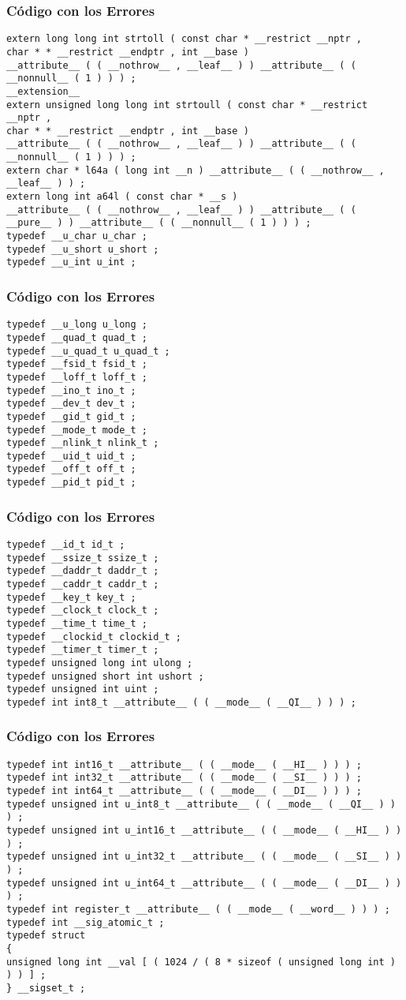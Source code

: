 \documentclass{beamer}
\begin{document}
\begin{frame}[fragile]
\frametitle{C\'odigo con los Errores}
\begin{lstlisting}[style=CStyle]
extern long long int strtoll ( const char * __restrict __nptr , 
char * * __restrict __endptr , int __base ) 
__attribute__ ( ( __nothrow__ , __leaf__ ) ) __attribute__ ( ( __nonnull__ ( 1 ) ) ) ; 
__extension__ 
extern unsigned long long int strtoull ( const char * __restrict __nptr , 
char * * __restrict __endptr , int __base ) 
__attribute__ ( ( __nothrow__ , __leaf__ ) ) __attribute__ ( ( __nonnull__ ( 1 ) ) ) ; 
extern char * l64a ( long int __n ) __attribute__ ( ( __nothrow__ , __leaf__ ) ) ; 
extern long int a64l ( const char * __s ) 
__attribute__ ( ( __nothrow__ , __leaf__ ) ) __attribute__ ( ( __pure__ ) ) __attribute__ ( ( __nonnull__ ( 1 ) ) ) ; 
typedef __u_char u_char ; 
typedef __u_short u_short ; 
typedef __u_int u_int ; 
\end{lstlisting}
\end{frame}
\begin{frame}[fragile]
\frametitle{C\'odigo con los Errores}
\begin{lstlisting}[style=CStyle]
typedef __u_long u_long ; 
typedef __quad_t quad_t ; 
typedef __u_quad_t u_quad_t ; 
typedef __fsid_t fsid_t ; 
typedef __loff_t loff_t ; 
typedef __ino_t ino_t ; 
typedef __dev_t dev_t ; 
typedef __gid_t gid_t ; 
typedef __mode_t mode_t ; 
typedef __nlink_t nlink_t ; 
typedef __uid_t uid_t ; 
typedef __off_t off_t ; 
typedef __pid_t pid_t ; 
\end{lstlisting}
\end{frame}
\begin{frame}[fragile]
\frametitle{C\'odigo con los Errores}
\begin{lstlisting}[style=CStyle]
typedef __id_t id_t ; 
typedef __ssize_t ssize_t ; 
typedef __daddr_t daddr_t ; 
typedef __caddr_t caddr_t ; 
typedef __key_t key_t ; 
typedef __clock_t clock_t ; 
typedef __time_t time_t ; 
typedef __clockid_t clockid_t ; 
typedef __timer_t timer_t ; 
typedef unsigned long int ulong ; 
typedef unsigned short int ushort ; 
typedef unsigned int uint ; 
typedef int int8_t __attribute__ ( ( __mode__ ( __QI__ ) ) ) ; 
\end{lstlisting}
\end{frame}
\begin{frame}[fragile]
\frametitle{C\'odigo con los Errores}
\begin{lstlisting}[style=CStyle]
typedef int int16_t __attribute__ ( ( __mode__ ( __HI__ ) ) ) ; 
typedef int int32_t __attribute__ ( ( __mode__ ( __SI__ ) ) ) ; 
typedef int int64_t __attribute__ ( ( __mode__ ( __DI__ ) ) ) ; 
typedef unsigned int u_int8_t __attribute__ ( ( __mode__ ( __QI__ ) ) ) ; 
typedef unsigned int u_int16_t __attribute__ ( ( __mode__ ( __HI__ ) ) ) ; 
typedef unsigned int u_int32_t __attribute__ ( ( __mode__ ( __SI__ ) ) ) ; 
typedef unsigned int u_int64_t __attribute__ ( ( __mode__ ( __DI__ ) ) ) ; 
typedef int register_t __attribute__ ( ( __mode__ ( __word__ ) ) ) ; 
typedef int __sig_atomic_t ; 
typedef struct 
{ 
unsigned long int __val [ ( 1024 / ( 8 * sizeof ( unsigned long int ) ) ) ] ; 
} __sigset_t ; 
\end{lstlisting}
\end{frame}
\end{document}
